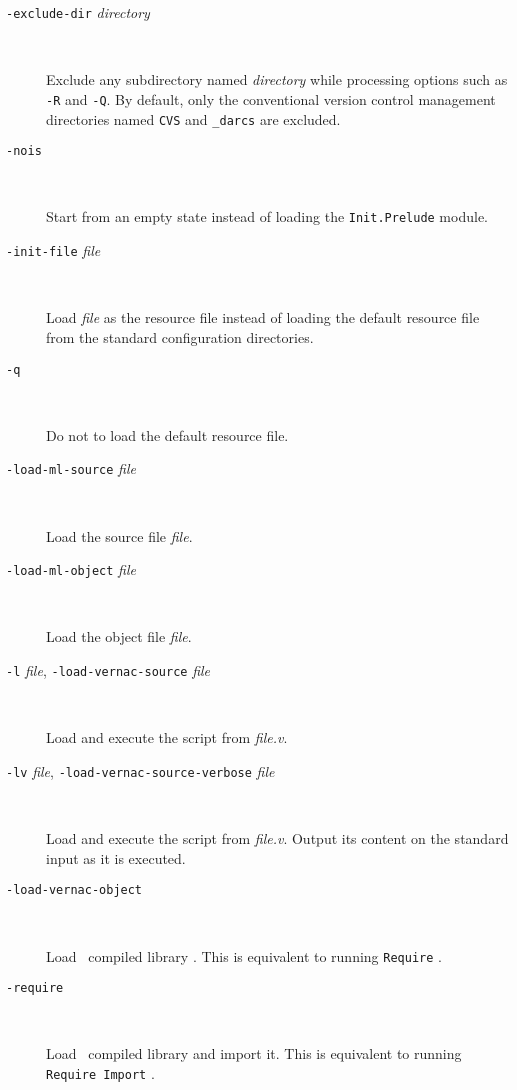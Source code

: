 \begin{description}
\item[{\tt -exclude-dir} {\em directory}]\ %

  Exclude any subdirectory named {\em directory} while
  processing options such as {\tt -R} and {\tt -Q}. By default, only the
  conventional version control management directories named {\tt CVS} and
  {\tt \_darcs} are excluded.

\item[{\tt -nois}]\ %

  Start from an empty state instead of loading the {\tt Init.Prelude}
  module.

\item[{\tt -init-file} {\em file}]\ %

  Load {\em file} as the resource file instead of loading the default
  resource file from the standard configuration directories.

\item[{\tt -q}]\ %

  Do not to load the default resource file.

\item[{\tt -load-ml-source} {\em file}]\ %

  Load the {\ocaml} source file {\em file}.

\item[{\tt -load-ml-object} {\em file}]\ %

  Load the {\ocaml} object file {\em file}.

\item[{\tt -l} {\em file}, {\tt -load-vernac-source} {\em file}]\ %

  Load and execute the {\Coq} script from {\em file.v}.

\item[{\tt -lv} {\em file}, {\tt -load-vernac-source-verbose} {\em
    file}]\ %

  Load and execute the {\Coq} script from {\em file.v}.
  Output its content on the standard input as it is executed.

\item[{\tt -load-vernac-object} {\dirpath}]\ %

  Load \Coq~compiled library {\dirpath}. This is equivalent to running
  {\tt Require} {\dirpath}.

\item[{\tt -require} {\dirpath}]\ %

  Load \Coq~compiled library {\dirpath} and import it. This is equivalent
  to running {\tt Require Import} {\dirpath}.


\end{description}
